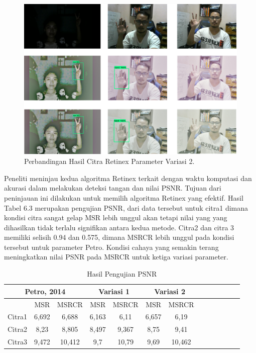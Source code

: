\begin{figure}[H]
	\centering
	\includegraphics[width=0.85\linewidth]{versi2}
	\caption{Perbandingan Hasil Citra Retinex Parameter Variasi 2.}
	\label{fig:ps}
\end{figure}
Peneliti meninjau kedua algoritma Retinex terkait dengan waktu komputasi dan akurasi dalam melakukan deteksi tangan dan nilai PSNR. Tujuan dari peninjauan ini dilakukan untuk memilih algoritma Retinex yang efektif. Hasil Tabel 6.3 merupakan pengujian PSNR, dari data tersebut untuk citra1 dimana kondisi citra sangat gelap MSR lebih unggul akan tetapi nilai yang yang dihasilkan tidak terlalu signifikan antara kedua metode. Citra2 dan citra 3 memiliki selisih 0.94 dan 0.575, dimana MSRCR lebih unggul pada kondisi tersebut untuk parameter Petro. Kondisi cahaya yang semakin terang meningkatkan nilai PSNR pada MSRCR untuk ketiga variasi parameter.
\begin{table}[H]
	\caption{Hasil Pengujian PSNR}
	\vspace{0cm}
	\centering
	\begin{tabular}{|c|c|c|c|c|c|c|c|c|c|c|c|c|}
		\hline
		\multicolumn{3}{|c|}{Petro, 2014} &\multicolumn{2}{|c|}{Variasi 1}&\multicolumn{2}{|c|}{Variasi 2} \\
		\hline   &MSR &MSRCR &MSR&MSRCR&MSR&MSRCR\\
		\hline  Citra1 & 6,692&6,688 &6,163 &6,11 &6,657 &6,19 \\
		\hline   Citra2 & 8,23&8,805 &8,497 &9,367 &8,75 &9,41\\
		\hline Citra3 & 9,472& 10,412&9,7 &10,79 & 9,69&10,462\\
		\hline
	\end{tabular}
\end{table}
